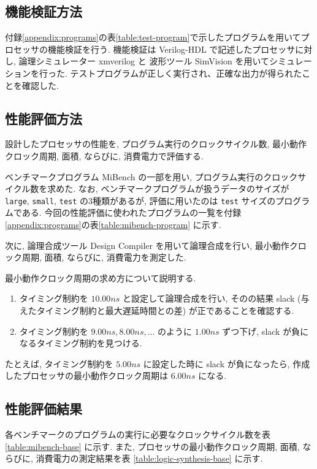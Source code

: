 \documentclass[../main.tex]{subfiles}
\begin{document}
  \subsection{機能検証方法}
  付録\ref{appendix:programs}の表\ref{table:test-program}で示したプログラムを用いてプロセッサの機能検証を行う.
  機能検証は Verilog-HDL で記述したプロセッサに対し, 
  論理シミュレーター xmverilog と
  波形ツール SimVision を用いてシミュレーションを行った.
  テストプログラムが正しく実行され、正確な出力が得られたことを確認した.

  \subsection{性能評価方法}
  設計したプロセッサの性能を, プログラム実行のクロックサイクル数, 
  最小動作クロック周期, 面積, ならびに, 消費電力で評価する.

  ベンチマークプログラム MiBench \cite{mibench} の一部を用い, プログラム実行のクロックサイクル数を求めた.
  なお, ベンチマークプログラムが扱うデータのサイズが \verb|large|, \verb|small|, \verb|test| の3種類があるが, 
  評価に用いたのは \verb|test| サイズのプログラムである.
  今回の性能評価に使われたプログラムの一覧を付録\ref{appendix:programs}の表\ref{table:mibench-program} に示す.

  次に, 論理合成ツール Design Compiler を用いて論理合成を行い, 
  最小動作クロック周期, 面積, ならびに, 消費電力を測定した.

  最小動作クロック周期の求め方について説明する.
  \begin{enumerate}
    \item タイミング制約を $10.00\unit{ns}$ と設定して論理合成を行い, 
    そのの結果 slack (与えたタイミング制約と最大遅延時間との差) が正であることを確認する.
    \item タイミング制約を $9.00\unit{ns}, 8.00\unit{ns}, \ldots$ のように $1.00\unit{ns}$ ずつ下げ, 
    slack が負になるタイミング制約を見つける.
  \end{enumerate}

  たとえば, タイミング制約を $5.00\unit{ns}$ に設定した時に slack が負になったら, 
  作成したプロセッサの最小動作クロック周期は $6.00\unit{ns}$ になる.

  \subsection{性能評価結果}
  各ベンチマークのプログラムの実行に必要なクロックサイクル数を表 \ref{table:mibench-base} に示す.
  また, プロセッサの最小動作クロック周期, 面積, ならびに, 消費電力の測定結果を表 \ref{table:logic-synthesis-base} に示す.
\end{document}
